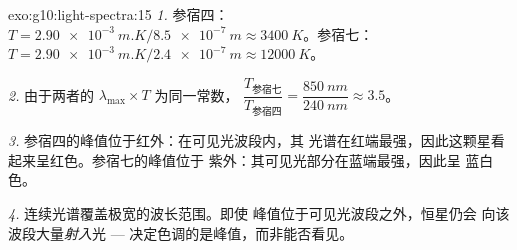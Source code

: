 \begin{solution}{exo:g10:light-spectra:15}
\emph{1.} 参宿四：
$T = \qty{2.90e-3}{m.K} / \qty{8.5e-7}{m} \approx \qty{3400}{K}$。参宿七：
$T = \qty{2.90e-3}{m.K} / \qty{2.4e-7}{m} \approx \qty{12000}{K}$。

\emph{2.} 由于两者的 $\lambda_{\max} \times T$ 为同一常数，
$\dfrac{T_{\text{参宿七}}}{T_{\text{参宿四}}}
= \dfrac{\qty{850}{nm}}{\qty{240}{nm}} \approx 3.5$。

\emph{3.} 参宿四的峰值位于红外：在可见光波段内，其
光谱在红端最强，因此这颗星看起来呈红色。参宿七的峰值位于
紫外：其可见光部分在蓝端最强，因此呈
蓝白色。

\emph{4.} 连续光谱覆盖极宽的波长范围。即使
峰值位于可见光波段之外，恒星仍会
向该波段大量\emph{射入}光 --- 决定色调的是峰值，而非能否看见。
\end{solution}

